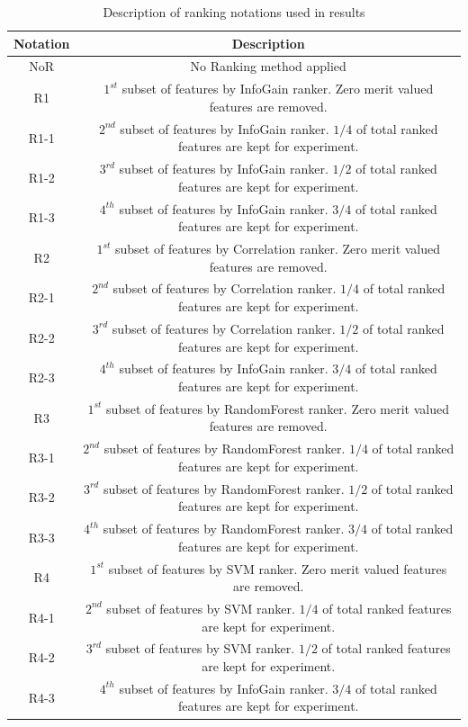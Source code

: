 \begin{table}[h] 
	\centering \caption{Description of ranking notations used in results} 
	\begin{tabular}{|c|c|}\hline
		\textbf{Notation}  & \textbf{Description} \\\hline
		NoR & No Ranking method applied \\\hline
		R1 & $1^{st}$ subset of features by InfoGain ranker. Zero merit valued features are removed. \\\hline
		R1-1 & $2^{nd}$ subset of features by InfoGain ranker. $1/4$ of total ranked features are kept for experiment. \\\hline
		R1-2 & $3^{rd}$ subset of features by InfoGain ranker. $1/2$ of total ranked features are kept for experiment. \\\hline
		R1-3 & $4^{th}$ subset of features by InfoGain ranker. $3/4$ of total ranked features are kept for experiment. \\\hline
		R2 & $1^{st}$ subset of features by Correlation ranker. Zero merit valued features are removed. \\\hline
		R2-1 & $2^{nd}$ subset of features by Correlation ranker. $1/4$ of total ranked features are kept for experiment. \\\hline
		R2-2 & $3^{rd}$ subset of features by Correlation ranker. $1/2$ of total ranked features are kept for experiment. \\\hline
		R2-3 & $4^{th}$ subset of features by InfoGain ranker. $3/4$ of total ranked features are kept for experiment. \\\hline
		R3 & $1^{st}$ subset of features by RandomForest ranker. Zero merit valued features are removed. \\\hline
		R3-1 & $2^{nd}$ subset of features by RandomForest ranker. $1/4$ of total ranked features are kept for experiment. \\\hline
		R3-2 & $3^{rd}$ subset of features by RandomForest ranker. $1/2$ of total ranked features are kept for experiment. \\\hline
		R3-3 & $4^{th}$ subset of features by RandomForest ranker. $3/4$ of total ranked features are kept for experiment. \\\hline
		R4 & $1^{st}$ subset of features by SVM ranker. Zero merit valued features are removed. \\\hline
		R4-1 & $2^{nd}$ subset of features by SVM ranker. $1/4$ of total ranked features are kept for experiment. \\\hline
		R4-2 & $3^{rd}$ subset of features by SVM ranker. $1/2$ of total ranked features are kept for experiment. \\\hline
		R4-3 & $4^{th}$ subset of features by InfoGain ranker. $3/4$ of total ranked features are kept for experiment. \\\hline
	\end{tabular}
	\label{t:resultnotations}
\end{table}

